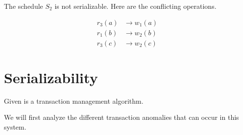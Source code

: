 \documentclass{article}
\begin{document}
\begin{enumerate}
        The schedule $S_2$ is not serializable. Here are the conflicting
        operations.

        \begin{align*}
            r_3 (a) &\to w_1 (a) \\
            r_1 (b) &\to w_2 (b) \\
            r_3 (c) &\to w_2 (c)
        \end{align*}
\end{enumerate}

\section{Serializability}

Given is a transaction management algorithm.

We will first analyze the different transaction anomalies that can occur in
this system.
\end{document}
